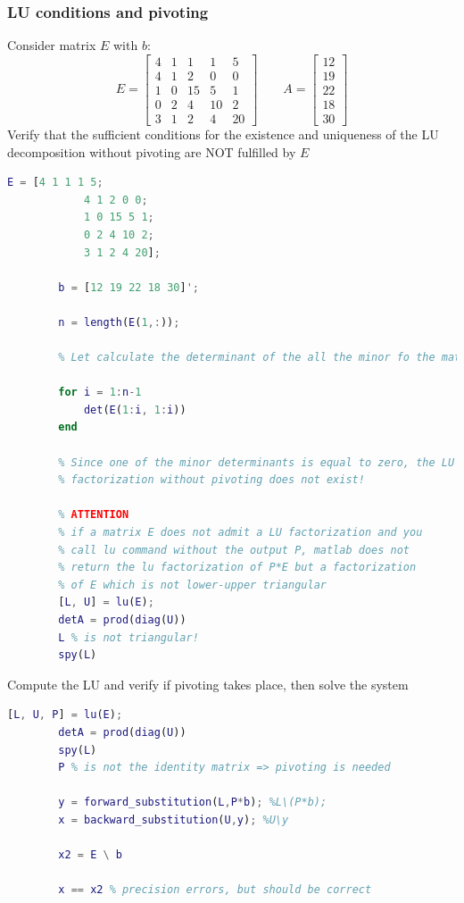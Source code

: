     \subsubsection{LU conditions and pivoting}
        Consider matrix $E$ with $b$:
        $$
        E=\begin{bmatrix}
            4 & 1 & 1 & 1 & 5\\
            4 & 1 & 2 & 0 & 0\\
            1 & 0 & 15 & 5 & 1\\
            0 & 2 & 4 & 10 & 2\\
            3 & 1 & 2 & 4 & 20
        \end{bmatrix}
        \qquad
        A=\begin{bmatrix}
            12\\
            19\\
            22\\
            18\\
            30
        \end{bmatrix}
        $$
        Verify that the sufficient conditions for the existence and uniqueness of the LU decomposition without pivoting are NOT fulfilled by $E$
        \begin{lstlisting}[language=Matlab, escapeinside=`', gobble=8]
        E = [4 1 1 1 5;
            4 1 2 0 0;
            1 0 15 5 1;
            0 2 4 10 2;
            3 1 2 4 20];

        b = [12 19 22 18 30]';

        n = length(E(1,:));

        % Let calculate the determinant of the all the minor fo the matrix E

        for i = 1:n-1
            det(E(1:i, 1:i))
        end

        % Since one of the minor determinants is equal to zero, the LU
        % factorization without pivoting does not exist!

        % ATTENTION
        % if a matrix E does not admit a LU factorization and you
        % call lu command without the output P, matlab does not 
        % return the lu factorization of P*E but a factorization
        % of E which is not lower-upper triangular
        [L, U] = lu(E);
        detA = prod(diag(U))
        L % is not triangular!
        spy(L)
        \end{lstlisting}

        Compute the LU and verify if pivoting takes place, then solve the system
        \begin{lstlisting}[language=Matlab, escapeinside=`', gobble=8]            
        [L, U, P] = lu(E);
        detA = prod(diag(U))
        spy(L)
        P % is not the identity matrix => pivoting is needed

        y = forward_substitution(L,P*b); %L\(P*b); 
        x = backward_substitution(U,y); %U\y

        x2 = E \ b

        x == x2 % precision errors, but should be correct
        \end{lstlisting}
        
